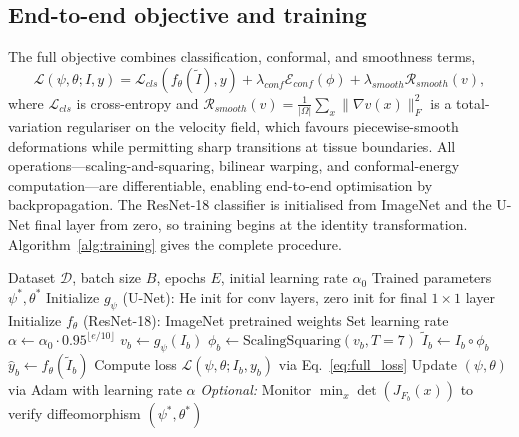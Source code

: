 \subsection{End-to-end objective and training}

The full objective combines classification, conformal, and smoothness terms,
\begin{equation}
\mathcal{L}(\psi,\theta;I,y)=\mathcal{L}_{cls}(f_\theta(\tilde{I}),y)+\lambda_{conf}\mathcal{E}_{conf}(\phi)+\lambda_{smooth}\mathcal{R}_{smooth}(v),
\label{eq:full_loss}
\end{equation}
where $\mathcal{L}_{cls}$ is cross-entropy and
$\mathcal{R}_{smooth}(v)=\frac{1}{|\Omega|}\sum_{x}\|\nabla v(x)\|_F^2$ is a
total-variation regulariser on the velocity field, which favours piecewise-smooth
deformations while permitting sharp transitions at tissue boundaries. All
operations---scaling-and-squaring, bilinear warping, and conformal-energy
computation---are differentiable, enabling end-to-end optimisation by
backpropagation. The ResNet-18 classifier is initialised from ImageNet and the
U-Net final layer from zero, so training begins at the identity transformation.
Algorithm~\ref{alg:training} gives the complete procedure.

\begin{algorithm}[t]
\caption{DCA Training Procedure}
\label{alg:training}
\begin{algorithmic}[1]
\REQUIRE Dataset $\mathcal{D}$, batch size $B$, epochs $E$, initial learning rate $\alpha_0$
\ENSURE Trained parameters $\psi^*, \theta^*$
\STATE Initialize $g_\psi$ (U-Net): He init for conv layers, zero init for final $1 \times 1$ layer
\STATE Initialize $f_\theta$ (ResNet-18): ImageNet pretrained weights
    \STATE Set learning rate $\alpha \leftarrow \alpha_0 \cdot 0.95^{\lfloor e/10 \rfloor}$
        \STATE $v_b \leftarrow g_\psi(I_b)$ \quad {}
        \STATE $\phi_b \leftarrow \text{ScalingSquaring}(v_b, T=7)$ \quad {}
        \STATE $\tilde{I}_b \leftarrow I_b \circ \phi_b$ \quad {}
        \STATE $\hat{y}_b \leftarrow f_\theta(\tilde{I}_b)$ \quad {}
        \STATE Compute loss $\mathcal{L}(\psi, \theta; I_b, y_b)$ via Eq.~\eqref{eq:full_loss}
        \STATE Update $(\psi, \theta)$ via Adam with learning rate $\alpha$
        \STATE \textit{Optional:} Monitor $\min_x \det(J_{F_b}(x))$ to verify diffeomorphism
    \ENDFOR
\ENDFOR
\RETURN $(\psi^*, \theta^*)$
\end{algorithmic}
\end{algorithm}


